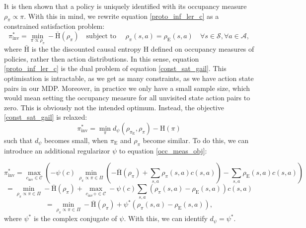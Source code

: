 It is then shown that a policy is uniquely identified with its occupancy measure $\rho_{\pi} \propto \pi$. With this in mind, we rewrite equation \ref{proto_inf_ler_c} as a constrained satisfaction problem:
\begin{equation}
    \label{const_sat_gail}
    \pi_{\text{inv}}^* = \min_{\pi \propto \rho_{\pi}} - \bar{\text{H}}(\rho_{\pi})\quad \text{subject to }\quad \rho_{\pi}(s,a) = \rho_{\text{E}}(s,a) \quad \forall s \in \mathcal{S}, \forall a \in \mathcal{A},
\end{equation}
where $\bar{\text{H}}$ is the the discounted causal entropy $\text{H}$ defined on occupancy measures of policies, rather then action distributions. In this sense, equation \ref{proto_inf_ler_c} is the dual problem of equation \ref{const_sat_gail}. 
This optimisation is intractable, as we get as many constraints, as we have action state pairs in our MDP. Moreover, in practice we only have a small sample size, which would mean setting 
the occupancy measure for all unvisited state action pairs to zero. This is obviously not the intended optimum. Instead, the objective \ref{const_sat_gail} is relaxed:
\begin{equation}
    \label{dist_opt}
    \pi_{\text{inv}}^* = \min_{\pi} d_{\psi}(\rho_{\pi_{\text{E}}}, \rho_{\pi}) - \text{H}(\pi)
\end{equation}
such that $d_{\psi}$ becomes small, when $\pi_{\text{E}}$ and $\rho_{\pi}$ become similar. To do this, we can introduce an additional regularizor $\psi$ to equation \ref{occ_meas_obj}:

\begin{equation*}
    \pi_{\text{inv}}^* = \max_{c_{\text{inv}} \in \mathcal{C}} \left(-\psi(c) \ \min_{\rho_\pi \propto \pi \in \Pi} \left(- \bar{\text{H}}(\rho_\pi) + \sum_{s,a} \rho_\pi(s,a) c(s,a) \right) - \sum_{s,a} \rho_{\text{E}}(s,a) c(s,a) \right)
\end{equation*}
\begin{equation*}
    = \min_{\rho_\pi \propto \pi \in \Pi}- \bar{\text{H}}(\rho_\pi) + \max_{c_{\text{inv}} + \in \mathcal{C}} -\psi(c) \sum_{s,a} \left( \rho_\pi(s,a) - \rho_{\text{E}}(s,a)\right) c(s,a)
\end{equation*}
\begin{equation}
    \label{proto_inf_ler_c_reg}
    = \min_{\rho_\pi \propto \pi \in \Pi}- \bar{\text{H}}(\rho_\pi) + \psi^*(\rho_\pi(s,a) - \rho_{\text{E}}(s,a)),
\end{equation}
where $\psi^*$ is the complex conjugate of $\psi$. With this, we can identify $d_{\psi} = \psi^*$.\\

